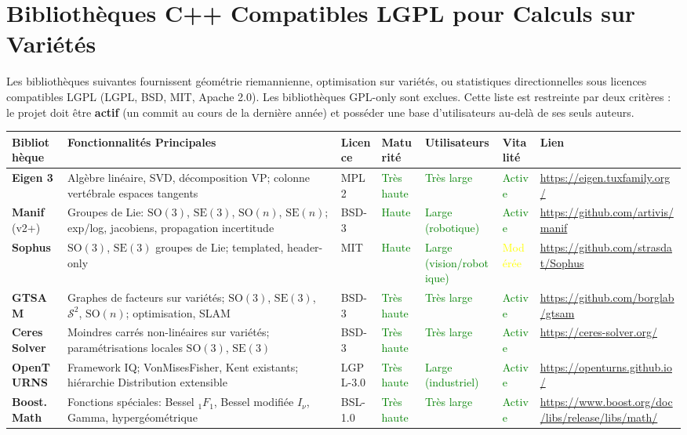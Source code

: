 \documentclass[11pt,a4paper]{article}
\begin{document}
\section{Bibliothèques C++ Compatibles LGPL pour Calculs sur Variétés}

Les bibliothèques suivantes fournissent géométrie riemannienne, optimisation sur variétés, ou statistiques directionnelles sous licences compatibles LGPL (LGPL, BSD, MIT, Apache 2.0). Les bibliothèques GPL-only sont exclues. Cette liste est restreinte par deux critères : le projet doit être \textbf{actif} (un commit au cours de la dernière année) et posséder une base d'utilisateurs au-delà de ses seuls auteurs.

\begin{longtable}{@{}p{2.3cm}p{3.8cm}p{1.5cm}p{1.5cm}p{1.5cm}p{1.5cm}p{2.5cm}@{}}
\toprule
\textbf{Bibliothèque} & \textbf{Fonctionnalités Principales} & \textbf{Licence} & \textbf{Maturité} & \textbf{Utilisateurs} & \textbf{Vitalité} & \textbf{Lien} \\
\midrule
\textbf{Eigen 3} & Algèbre linéaire, SVD, décomposition VP; colonne vertébrale espaces tangents & MPL2 & \textcolor{green}{Très haute} & \textcolor{green}{Très large} & \textcolor{green}{Active} & \url{https://eigen.tuxfamily.org/} \\
\textbf{Manif} (v2+) & Groupes de Lie: $\text{SO}(3)$, $\text{SE}(3)$, $\text{SO}(n)$, $\text{SE}(n)$; exp/log, jacobiens, propagation incertitude & BSD-3 & \textcolor{green}{Haute} & \textcolor{green}{Large (robotique)} & \textcolor{green}{Active} & \url{https://github.com/artivis/manif} \\
\textbf{Sophus} & $\text{SO}(3)$, $\text{SE}(3)$ groupes de Lie; templated, header-only & MIT & \textcolor{green}{Haute} & \textcolor{green}{Large (vision/robotique)} & \textcolor{yellow}{Modérée} & \url{https://github.com/strasdat/Sophus} \\
\textbf{GTSAM} & Graphes de facteurs sur variétés; $\text{SO}(3)$, $\text{SE}(3)$, $\mathcal{S}^2$, $\text{SO}(n)$; optimisation, SLAM & BSD-3 & \textcolor{green}{Très haute} & \textcolor{green}{Très large} & \textcolor{green}{Active} & \url{https://github.com/borglab/gtsam} \\
\textbf{Ceres Solver} & Moindres carrés non-linéaires sur variétés; paramétrisations locales $\text{SO}(3)$, $\text{SE}(3)$ & BSD-3 & \textcolor{green}{Très haute} & \textcolor{green}{Très large} & \textcolor{green}{Active} & \url{https://ceres-solver.org/} \\
\textbf{OpenTURNS} & Framework IQ; VonMisesFisher, Kent existants; hiérarchie Distribution extensible & LGPL-3.0 & \textcolor{green}{Très haute} & \textcolor{green}{Large (industriel)} & \textcolor{green}{Active} & \url{https://openturns.github.io/} \\
\textbf{Boost.Math} & Fonctions spéciales: Bessel ${}_1F_1$, Bessel modifiée $I_\nu$, Gamma, hypergéométrique & BSL-1.0 & \textcolor{green}{Très haute} & \textcolor{green}{Très large} & \textcolor{green}{Active} & \url{https://www.boost.org/doc/libs/release/libs/math/} \\
\bottomrule
\end{longtable}
\end{document}
